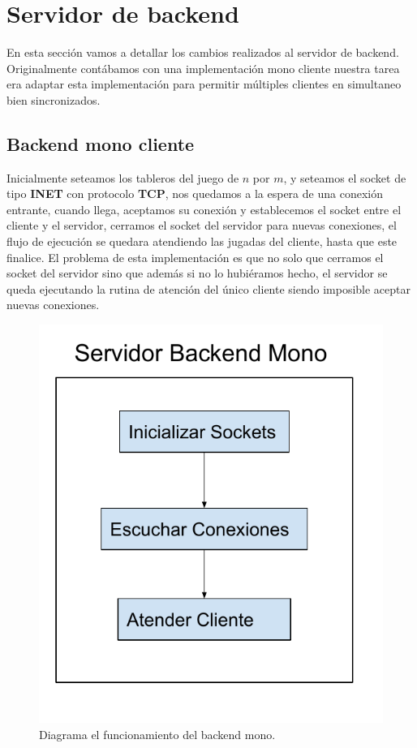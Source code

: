 \section{Servidor de backend}

En esta sección vamos a detallar los cambios realizados al servidor de backend. Originalmente contábamos con una implementación mono cliente nuestra tarea era adaptar esta implementación para permitir múltiples clientes en simultaneo bien sincronizados.

\subsection{Backend mono cliente}

Inicialmente seteamos los tableros del juego de $n$ por $m$, y seteamos el socket de tipo \textbf{INET} con protocolo \textbf{TCP}, nos quedamos a la espera de una conexión entrante, cuando llega, aceptamos su conexión y establecemos el socket entre el cliente y el servidor, cerramos el socket del servidor para nuevas conexiones, el flujo de ejecución se quedara atendiendo las jugadas del cliente, hasta que este finalice. El problema de esta implementación es que no solo que cerramos el socket del servidor sino que además si no lo hubiéramos hecho, el servidor se queda ejecutando la rutina de atención del único cliente siendo imposible aceptar nuevas conexiones.

\begin{figure}[H]
  \begin{center}
	\includegraphics[scale = 0.5]{./imagenes/so_tp2_1.pdf}
	\caption{Diagrama el funcionamiento del backend mono.}
	\label{fig:fig1}
  \end{center}
\end{figure}

